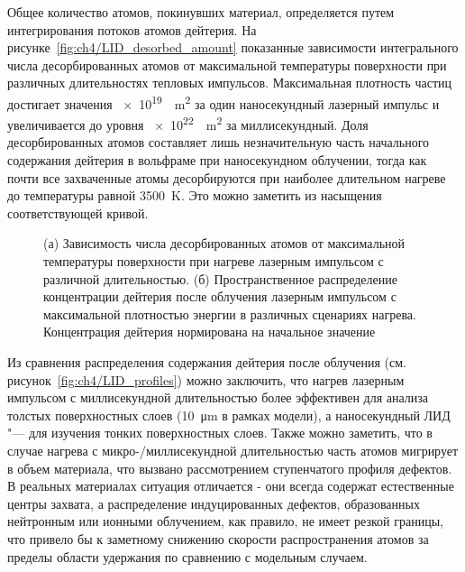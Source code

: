 Общее количество атомов, покинувших материал, определяется путем интегрирования потоков атомов дейтерия. На рисунке~\cref{fig:ch4/LID_desorbed_amount} показанные зависимости интегрального числа десорбированных атомов от максимальной температуры поверхности при различных длительностях тепловых импульсов. Максимальная плотность частиц достигает значения \SI{e19}{\per\meter\squared} за один наносекундный лазерный импульс и увеличивается до уровня \SI{e22}{\per\meter\squared} за миллисекундный. Доля десорбированных атомов составляет лишь незначительную часть начального содержания дейтерия в вольфраме при наносекундном облучении, тогда как почти все захваченные атомы десорбируются при наиболее длительном нагреве до температуры равной \SI{3500}{\kelvin}. Это можно заметить из насыщения соответствующей кривой.

\begin{figure}[ht]
    \caption{(а) Зависимость числа десорбированных атомов от максимальной температуры поверхности при нагреве лазерным импульсом с различной длительностью. (б) Пространственное распределение концентрации дейтерия после облучения лазерным импульсом с максимальной плотностью энергии в различных сценариях нагрева. Концентрация дейтерия нормирована на начальное значение}
\end{figure}

Из сравнения распределения содержания дейтерия после облучения (см. рисунок~\cref{fig:ch4/LID_profiles}) можно заключить, что нагрев лазерным импульсом с миллисекундной длительностью более эффективен для анализа толстых поверхностных слоев (\SI{10}{\micro\meter} в рамках модели), а наносекундный ЛИД "--- для изучения тонких поверхностных слоев. Также можно заметить, что в случае нагрева с микро-/миллисекундной длительностью часть атомов мигрирует в объем материала, что вызвано рассмотрением ступенчатого профиля дефектов. В реальных материалах ситуация отличается - они всегда содержат естественные центры захвата, а распределение индуцированных дефектов, образованных нейтронным или ионными облучением, как правило, не имеет резкой границы, что привело бы к заметному снижению скорости распространения атомов за пределы области удержания по сравнению с модельным случаем.

